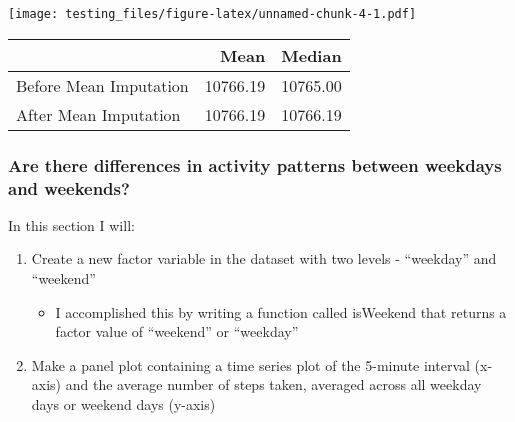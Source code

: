 \documentclass[]{article}
\newenvironment{Shaded}{\begin{snugshade}}{\end{snugshade}}
\newcommand{\KeywordTok}[1]{\textcolor[rgb]{0.13,0.29,0.53}{\textbf{#1}}}
\newcommand{\DataTypeTok}[1]{\textcolor[rgb]{0.13,0.29,0.53}{#1}}
\newcommand{\DecValTok}[1]{\textcolor[rgb]{0.00,0.00,0.81}{#1}}
\newcommand{\StringTok}[1]{\textcolor[rgb]{0.31,0.60,0.02}{#1}}
\newcommand{\CommentTok}[1]{\textcolor[rgb]{0.56,0.35,0.01}{\textit{#1}}}
\newcommand{\OperatorTok}[1]{\textcolor[rgb]{0.81,0.36,0.00}{\textbf{#1}}}
\newcommand{\NormalTok}[1]{#1}
\providecommand{\tightlist}{%
  \setlength{\itemsep}{0pt}\setlength{\parskip}{0pt}}
\begin{document}
\texttt{[image: testing\_files/figure-latex/unnamed-chunk-4-1.pdf]}

\begin{Shaded}
\end{Shaded}

\begin{longtable}[]{@{}lrr@{}}
\toprule
& Mean & Median\tabularnewline
\midrule
\endhead
Before Mean Imputation & 10766.19 & 10765.00\tabularnewline
After Mean Imputation & 10766.19 & 10766.19\tabularnewline
\bottomrule
\end{longtable}

\subsubsection{Are there differences in activity patterns between
weekdays and
weekends?}\label{are-there-differences-in-activity-patterns-between-weekdays-and-weekends}

In this section I will:

\begin{enumerate}
\def\labelenumi{\arabic{enumi}.}
\tightlist
\item
  Create a new factor variable in the dataset with two levels -
  ``weekday'' and ``weekend''

  \begin{itemize}
  \tightlist
  \item
    I accomplished this by writing a function called isWeekend that
    returns a factor value of ``weekend'' or ``weekday''
  \end{itemize}
\item
  Make a panel plot containing a time series plot of the 5-minute
  interval (x-axis) and the average number of steps taken, averaged
  across all weekday days or weekend days (y-axis)
\end{enumerate}
\end{document}
